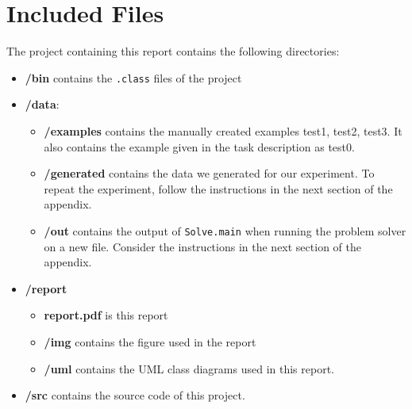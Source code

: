 \section{Included Files}
\label{app:included}

The project containing this report contains the following directories:

\begin{itemize}
	\item \textbf{/bin} contains the \texttt{.class} files of the project
	\item \textbf{/data}:
	\begin{itemize}
		\item \textbf{/examples} contains the manually created examples test1, test2, test3. It also contains the example given in the task description as test0.
		\item \textbf{/generated} contains the data we generated for our experiment. To repeat the experiment, follow the instructions in the next section of the appendix.
		\item \textbf{/out} contains the output of \texttt{Solve.main} when running the problem solver on a new file. Consider the instructions in the next section of the appendix.
	\end{itemize}
	\item \textbf{/report}
	\begin{itemize}
		\item \textbf{report.pdf} is this report
		\item \textbf{/img} contains the figure used in the report
		\item \textbf{/uml} contains the UML class diagrams used in this report.
	\end{itemize}
	\item \textbf{/src} contains the source code of this project.
\end{itemize} 

